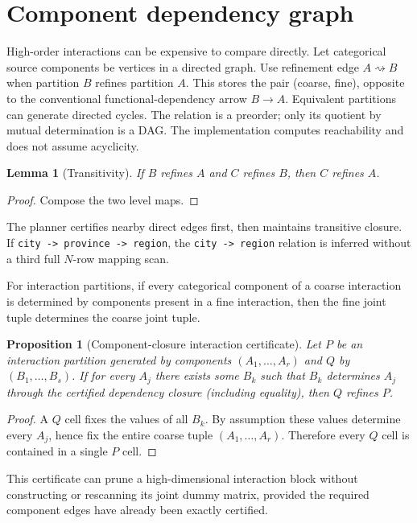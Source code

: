 \documentclass[11pt]{article}
\newtheorem{proposition}[theorem]{Proposition}
\newtheorem{lemma}[theorem]{Lemma}
\theoremstyle{definition}
\newcommand{\1}{\mathbf{1}}
\begin{document}
\section{Component dependency graph}

High-order interactions can be expensive to compare directly. Let categorical source components be vertices in a directed graph. Use refinement edge $A\rightsquigarrow B$ when partition $B$ refines partition $A$. This stores the pair (coarse, fine), opposite to the conventional functional-dependency arrow $B\to A$. Equivalent partitions can generate directed cycles. The relation is a preorder; only its quotient by mutual determination is a DAG. The implementation computes reachability and does not assume acyclicity.

\begin{lemma}[Transitivity]\label{lem:trans}
If $B$ refines $A$ and $C$ refines $B$, then $C$ refines $A$.
\end{lemma}
\begin{proof}
Compose the two level maps.
\end{proof}

The planner certifies nearby direct edges first, then maintains transitive closure. If \texttt{city -> province -> region}, the \texttt{city -> region} relation is inferred without a third full $N$-row mapping scan.

For interaction partitions, if every categorical component of a coarse interaction is determined by components present in a fine interaction, then the fine joint tuple determines the coarse joint tuple.

\begin{proposition}[Component-closure interaction certificate]\label{prop:interaction}
Let $P$ be an interaction partition generated by components $(A_1,\dots,A_r)$ and $Q$ by $(B_1,\dots,B_s)$. If for every $A_j$ there exists some $B_k$ such that $B_k$ determines $A_j$ through the certified dependency closure (including equality), then $Q$ refines $P$.
\end{proposition}
\begin{proof}
A $Q$ cell fixes the values of all $B_k$. By assumption these values determine every $A_j$, hence fix the entire coarse tuple $(A_1,\dots,A_r)$. Therefore every $Q$ cell is contained in a single $P$ cell.
\end{proof}

This certificate can prune a high-dimensional interaction block without constructing or rescanning its joint dummy matrix, provided the required component edges have already been exactly certified.
\end{document}
